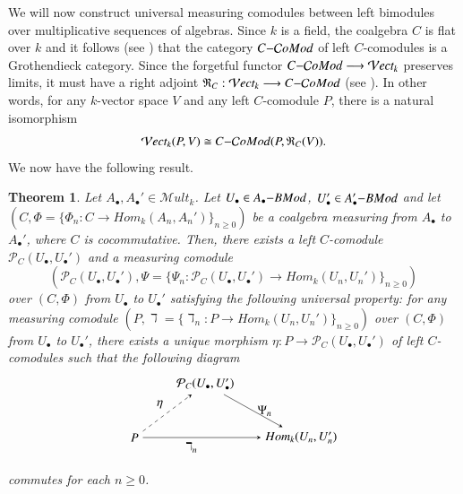 \documentclass[10pt, colorlinks]{article}
\numberwithin{equation}{section} \DeclareMathSizes{2}{10}{12}{13}
\newtheorem{Thm}[thm]{Theorem}
\begin{document}
We will now construct universal measuring comodules between left bimodules over multiplicative sequences of algebras. Since $k$ is a field, the coalgebra $C$ is flat over $k$ and it follows (see \cite[\S 1]{RW}) that the category $C{\small{-}}\mathcal CoMod$  of left $C$-comodules is a Grothendieck category.  Since the forgetful functor $C{\small{-}}\mathcal CoMod\longrightarrow \mathcal Vect_k$ preserves limits, it must have a  right adjoint $\mathfrak R_C: \mathcal Vect_k\longrightarrow C{\small{-}}\mathcal CoMod$ (see \cite[Proposition 8.3.27]{MK}). In other words, for any $k$-vector space $V$ and any left $C$-comodule $P$, there is a natural isomorphism
\begin{equation}\label{5.11p}
    \mathcal Vect_k(P,V)\cong C{\small{-}}\mathcal CoMod(P,\mathfrak R_C(V)).
\end{equation}
We now have the following result. 
\begin{Thm}\label{Thm5.4}
    Let $A_\bullet,A_\bullet'\in \mathscr Mult_k$. Let $U_\bullet\in A_\bullet{\small{-}}BMod$, $U_\bullet'\in A'_\bullet{\small{-}}BMod$ and  let $(C,\Phi=\{\Phi_n:C\longrightarrow Hom_k(A_n,A_n')\}_{n\geq 0})$ be a coalgebra measuring from $A_\bullet$ to $A_\bullet'$, where $C$ is cocommutative. Then, there exists a left $C$-comodule $\mathcal P_C(U_\bullet,U_\bullet')$ and a measuring comodule \begin{equation}
        \left(\mathcal P_C(U_\bullet,U_\bullet'),\Psi=\{\Psi_n:\mathcal P_C(U_\bullet,U_\bullet')\longrightarrow  {Hom}_k(U_n,U_n')\}_{n\geq 0}\right)
    \end{equation} 
     over $(C,\Phi)$ from $U_\bullet$ to $U_\bullet'$ satisfying the following universal property: for any measuring comodule $(P,\daleth=\{\daleth_n:P\longrightarrow Hom_k(U_n,U_n')\}_{n\geq 0})$ over $(C,\Phi)$ from $U_\bullet$ to $U_\bullet'$, there exists a unique morphism $\eta:P\longrightarrow \mathcal P_C(U_\bullet,U_\bullet')$ of left $C$-comodules such that the following diagram 
    \begin{equation*}
         \begin{tikzpicture}[>=stealth]
\node (A) at (0,0) {$P$};
\node (B) at (2.0,1.5) {$\mathcal P_C(U_\bullet,U_\bullet')$};
\node (C) at (4.7,0) {$ {Hom}_k(U_n,U_n')$};

\draw[->, dashed] (A) -- node[above left] {$\eta$} (B);
\draw[->] (A) -- node[below left] {$\daleth_n$} (C);
\draw[->] (B) -- node[right] {$\Psi_n$} (C);
\end{tikzpicture}
    \end{equation*}
    commutes for each  $n\geq 0$.
\end{Thm}
\end{document}
